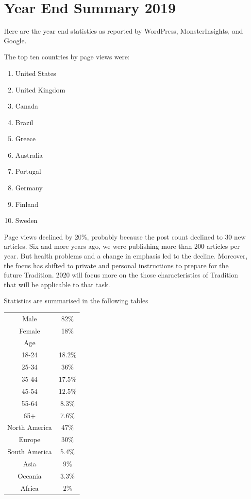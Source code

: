 \section{Year End Summary 2019}

Here are the year end statistics as reported by WordPress, MonsterInsights, and Google.

The top ten countries by page views were:

\begin{enumerate}


\item United States

\item United Kingdom

\item Canada

\item Brazil

\item Greece

\item Australia

\item Portugal

\item Germany

\item Finland

\item Sweden
\end{enumerate}


Page views declined by 20\%, probably because the post count declined to 30 new articles. Six and more years ago, we were publishing more than 200 articles per year. But health problems and a change in emphasis led to the decline. Moreover, the focus has shifted to private and personal instructions to prepare for the future Tradition. 2020 will focus more on the those characteristics of Tradition that will be applicable to that task.

Statistics are summarised in the following tables

\begin{table}[h]\small\centering
\begin{tabular}{cc}
Male & 82\% \\
Female & 18\% \\
Age &\\
18-24 & 18.2\% \\
25-34 & 36\% \\
35-44 & 17.5\% \\
45-54 & 12.5\% \\
55-64 & 8.3\% \\
65+ & 7.6\% \\
North America & 47\% \\
Europe & 30\% \\
South America & 5.4\% \\
Asia & 9\% \\
Oceania & 3.3\% \\
Africa & 2\% 
\end{tabular}
\end{table}

